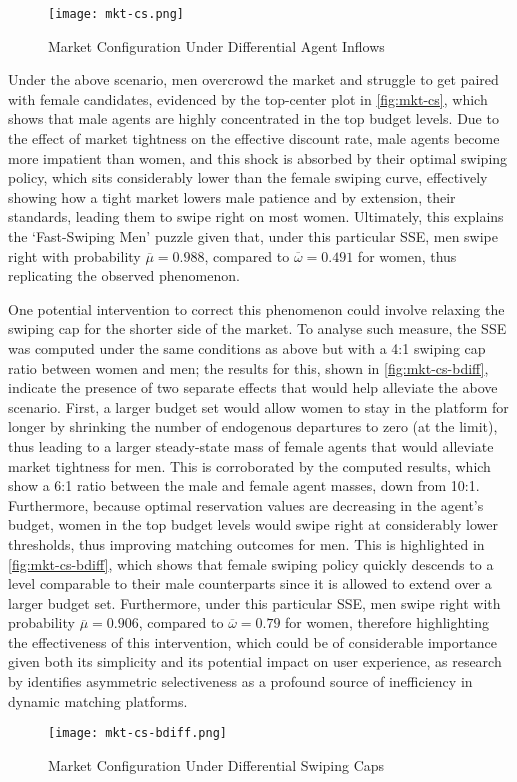 \begin{figure}[ht]
    \centering
    \caption{Market Configuration Under Differential Agent Inflows}
    \texttt{[image: mkt-cs.png]}
    \label{fig:mkt-cs} 
\end{figure} 

Under the above scenario, men overcrowd the market and struggle to get paired with female candidates, evidenced by the top-center plot in \autoref{fig:mkt-cs}, which shows that male agents are highly concentrated in the top budget levels. 
Due to the effect of market tightness on the effective discount rate, male agents become more impatient than women, and this shock is absorbed by their optimal swiping policy, which sits considerably lower than the female swiping curve, effectively showing how a tight market lowers male patience and by extension, their standards, leading them to swipe right on most women. 
Ultimately, this explains the `Fast-Swiping Men' puzzle given that, under this particular SSE, men swipe right with probability $\overline\mu=0.988$, compared to $\overline\omega=0.491$ for women, thus replicating the observed phenomenon. 

One potential intervention to correct this phenomenon could involve relaxing the swiping cap for the shorter side of the market.
To analyse such measure, the SSE was computed under the same conditions as above but with a 4:1 swiping cap ratio between women and men; the results for this, shown in \autoref{fig:mkt-cs-bdiff}, indicate the presence of two separate effects that would help alleviate the above scenario. 
First, a larger budget set would allow women to stay in the platform for longer by shrinking the number of endogenous departures to zero (at the limit), thus leading to a larger steady-state mass of female agents that would alleviate market tightness for men. 
This is corroborated by the computed results, which show a 6:1 ratio between the male and female agent masses, down from 10:1. 
Furthermore, because optimal reservation values are decreasing in the agent's budget, women in the top budget levels would swipe right at considerably lower thresholds, thus improving matching outcomes for men. 
This is highlighted in \autoref{fig:mkt-cs-bdiff}, which shows that female swiping policy quickly descends to a level comparable to their male counterparts since it is allowed to extend over a larger budget set. 
Furthermore, under this particular SSE, men swipe right with probability $\overline\mu=0.906$, compared to $\overline\omega=0.79$ for women, therefore highlighting the effectiveness of this intervention, which could be of considerable importance given both its simplicity and its potential impact on user experience, as research by \cite{kanoria2021facilitating} identifies asymmetric selectiveness as a profound source of inefficiency in dynamic matching platforms.  
\begin{figure}[ht]
    \centering
    \caption{Market Configuration Under Differential Swiping Caps}
    \texttt{[image: mkt-cs-bdiff.png]}
    \label{fig:mkt-cs-bdiff} 
\end{figure}
